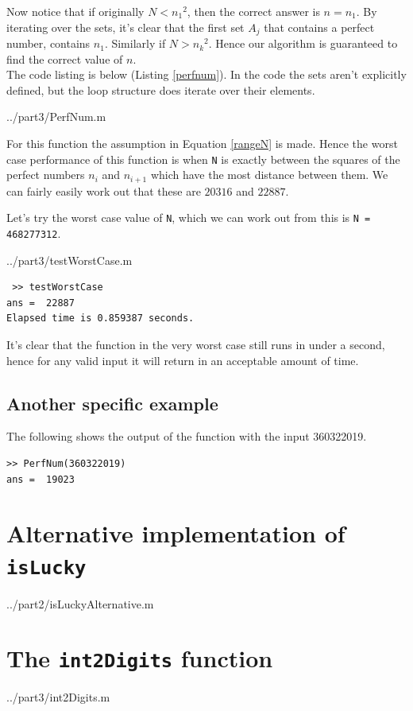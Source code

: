 \documentclass[10pt]{article}
\begin{document}
Now notice that if originally $N < {n_1}^2$, then the correct answer is $n = n_1$. By iterating over the sets, it's clear that the first set $A_j$ that contains a perfect number, contains $n_1$. Similarly if $N > {n_k}^2$. Hence our algorithm is guaranteed to find the correct value of $n$. \\

The code listing is below (Listing \ref{perfnum}). In the code the sets aren't explicitly  defined, but the loop structure does iterate over their elements.

  {../part3/PerfNum.m}
 
For this function the assumption in Equation \ref{rangeN} is made. Hence the worst case performance of this function is when \texttt{N} is exactly between the squares of the perfect numbers $n_i$ and $n_{i+1}$ which have the most distance between them. We can fairly easily work out that these are $20316$ and $22887$. 

Let's try the worst case value of \texttt{N}, which we can work out from this is \texttt{N = 468277312}.

   {../part3/testWorstCase.m}
  
 \begin{verbatim}
 >> testWorstCase
ans =  22887
Elapsed time is 0.859387 seconds.
\end{verbatim}

It's clear that the function in the very worst case still runs in under a second, hence for any valid input it will return in an acceptable amount of time.

\subsection{Another specific example}

The following shows the output of the  function with the input 360322019.

\begin{verbatim}
>> PerfNum(360322019)
ans =  19023
\end{verbatim}
\begin{appendices}


\section{Alternative implementation of \texttt{isLucky}}\label{islucky_appendix}

   {../part2/isLuckyAlternative.m}
  
\section{The \texttt{int2Digits} function}

   {../part3/int2Digits.m}

\end{appendices}
\end{document}
